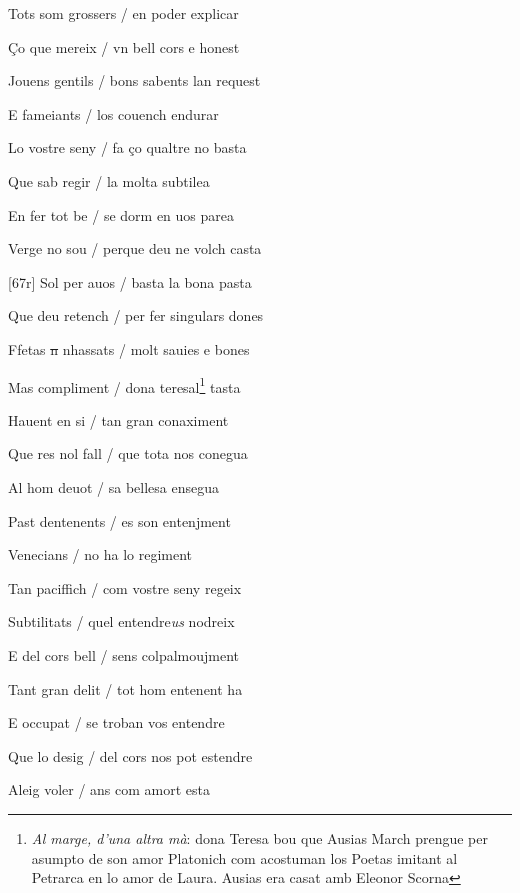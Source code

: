 \documentclass[12pt]{article}
\begin{document}
\begin{estrofa}

 Tots som grossers / en poder explicar

 \c{C}o que mereix / vn bell cors e honest

 Jouens gentils / bons sabents lan request

 E fameiants / los couench endurar

 Lo vostre seny / fa \c{c}o qualtre no basta

 Que sab regir / la molta subtilea

 En fer tot be / se dorm en uos parea

 Verge no sou / perque deu ne volch casta

\end{estrofa}



\begin{estrofa}

 [67r] Sol per auos / basta la bona pasta

 Que deu retench / per fer singulars dones

 Ffetas \sout{n} nhassats / molt sauies e bones

 Mas compliment / dona teresal\footnote{\textit{Al marge, d'una altra m\`{a}}:
dona Teresa bou que Ausias March prengue per asumpto de son amor Platonich com
acostuman los Poetas imitant al Petrarca en lo amor de Laura. Ausias era casat
amb Eleonor Scorna} tasta

 Hauent en si / tan gran conaximent

 Que res nol fall / que tota nos conegua

 Al hom deuot / sa bellesa ensegua

 Past dentenents / es son entenjment

\end{estrofa}



\begin{estrofa}

 Venecians / no ha lo regiment

 Tan paciffich / com vostre seny regeix

 Subtilitats / quel entendre\textit{us} nodreix

 E del cors bell / sens colpalmoujment

 Tant gran delit / tot hom entenent ha

 E occupat / se troban vos entendre

 Que lo desig / del cors nos pot estendre

 Aleig voler / ans com amort esta

\end{estrofa}
\end{document}
